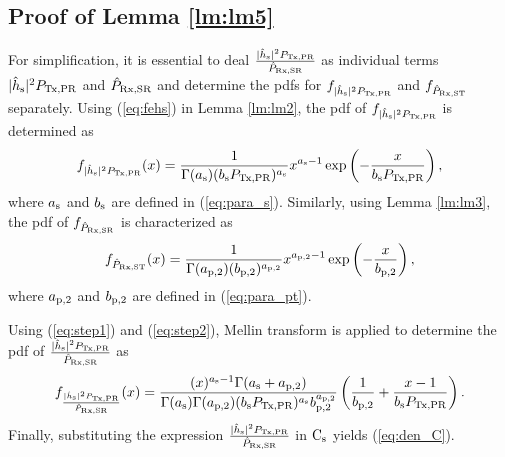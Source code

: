 \subsection{Proof of Lemma \ref{lm:lm5}} \label{ap:one}
\begin{IEEEproof}
For simplification, it is essential to deal $\frac{|\hat{h}_{\text{s}}|^2 P_{\text{Tx,PR}}}{\hat{P}_{\text{Rx,SR}}}$ as individual terms $|\hat{h}_{\text{s}}|^2 P_{\text{Tx,PR}}$ and $\hat{P}_{\text{Rx,SR}}$ and determine the pdfs for $f_{|\hat{h}_{\text{s}}|^2 P_{\text{Tx,PR}}}$ and $f_{\hat{P}_{\text{Rx,ST}}}$ separately.
Using (\ref{eq:fehs}) in Lemma \ref{lm:lm2}, the pdf of $f_{|\hat{h}_{\text{s}}|^2 P_{\text{Tx,PR}}}$ is determined as
\begin{align}
f_{|\hat{h}_{\text{s}}|^2 P_{\text{Tx,PR}}}(x) = \frac{1}{\Gamma(a_{\text{s}}) (b_{\text{s}} P_{\text{Tx,PR}})^{a_{\text{s}}}} x^{a_{\text{s}} - 1} \exp\left( - \frac{x}{ b_{\text{s}} P_{\text{Tx,PR}}} \right), \label{eq:step1} 
\end{align}
where $a_{\text{s}}$ and $b_{\text{s}}$ are defined in (\ref{eq:para_s}).
Similarly, using Lemma \ref{lm:lm3}, the pdf of $f_{\hat{P}_{\text{Rx,SR}}}$ is characterized as
\begin{align}
f_{\hat{P}_{\text{Rx,ST}}}(x) = \frac{1}{\Gamma(a_{\text{p,2}}) (b_{\text{p,2}})^{a_{\text{p,2}}}} x^{a_{\text{p,2}} - 1} \exp\left( - \frac{x}{ b_{\text{p,2}}} \right), \label{eq:step2} 
\end{align}
where $a_{\text{p,2}}$ and $b_{\text{p,2}}$ are defined in (\ref{eq:para_pt}).

Using (\ref{eq:step1}) and (\ref{eq:step2}), Mellin transform \cite{NIST} is applied to determine the pdf of $\frac{|\hat{h}_{\text{s}}|^2 P_{\text{Tx,PR}}}{\hat{P}_{\text{Rx,SR}}}$ as
\begin{align}
f_{\frac{|\hat{h}_{\text{s}}|^2 P_{\text{Tx,PR}}}{\hat{P}_{\text{Rx,SR}}}}(x) = \frac{(x)^{a_{\text{s}} - 1} \Gamma(a_{\text{s}} + a_{\text{p,2}})}{\Gamma(a_{\text{s}}) \Gamma(a_{\text{p,2}}) (b_{\text{s}} P_{\text{Tx,PR}}) ^{a_{\text{s}}} b_{\text{p,2}}^{a_{\text{p,2}}}} \left(\frac{1}{b_{\text{p,2}}} + \frac{x - 1}{b_{\text{s}} P_{\text{Tx,PR}}}\right).
\end{align}
Finally, substituting the expression $\frac{|\hat{h}_{\text{s}}|^2 P_{\text{Tx,PR}}}{\hat{P}_{\text{Rx,SR}}}$ in $\text{C}_{\text{s}}$ yields (\ref{eq:den_C}).
\end{IEEEproof}
